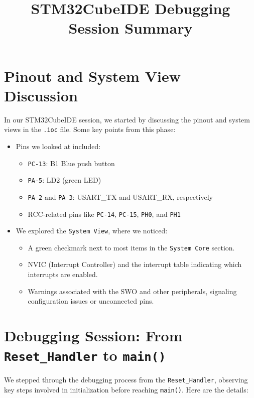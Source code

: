 \documentclass{article}
\title{STM32CubeIDE Debugging Session Summary}
\author{}
\date{}
\begin{document}
\maketitle

\section{Pinout and System View Discussion}

In our STM32CubeIDE session, we started by discussing the pinout and system views in the \texttt{.ioc} file. Some key points from this phase:

\begin{itemize}
    \item Pins we looked at included:
    \begin{itemize}
        \item \texttt{PC-13}: B1 Blue push button
        \item \texttt{PA-5}: LD2 (green LED)
        \item \texttt{PA-2} and \texttt{PA-3}: USART\_TX and USART\_RX, respectively
        \item RCC-related pins like \texttt{PC-14}, \texttt{PC-15}, \texttt{PH0}, and \texttt{PH1}
    \end{itemize}
    \item We explored the \texttt{System View}, where we noticed:
    \begin{itemize}
        \item A green checkmark next to most items in the \texttt{System Core} section.
        \item NVIC (Interrupt Controller) and the interrupt table indicating which interrupts are enabled.
        \item Warnings associated with the SWO and other peripherals, signaling configuration issues or unconnected pins.
    \end{itemize}
\end{itemize}

\section{Debugging Session: From \texttt{Reset\_Handler} to \texttt{main()}}

We stepped through the debugging process from the \texttt{Reset\_Handler}, observing key steps involved in initialization before reaching \texttt{main()}. Here are the details:
\end{document}
